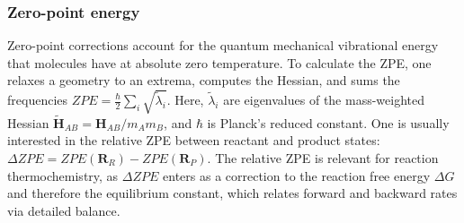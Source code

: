 \documentclass[pdflatex,sn-mathphys-num]{sn-jnl}%
\theoremstyle{thmstyleone}%
\theoremstyle{thmstyletwo}%
\theoremstyle{thmstylethree}%
\begin{document}
\begin{appendices}
\subsubsection{Zero-point energy}
Zero-point corrections account for the quantum mechanical vibrational energy that molecules have at absolute zero temperature. To calculate the ZPE, one relaxes a geometry to an extrema, computes the Hessian, and sums the frequencies
$ZPE = \frac{\hbar}{2} \sum_i \sqrt{\tilde{\lambda}_i}$.
Here, $\tilde{\lambda}_i$ are eigenvalues of the mass-weighted Hessian $\mathbf{\tilde{H}}_{AB} = \mathbf{H}_{AB}/m_Am_B$, and $\hbar$ is Planck's reduced constant.
One is usually interested in the relative ZPE between reactant and product states: $\Delta ZPE = ZPE(\mathbf{R}_R) - ZPE(\mathbf{R}_P)$. The relative ZPE is relevant for reaction thermochemistry, as $\Delta ZPE$ enters as a correction to the reaction free energy $\Delta G$ and therefore the equilibrium constant, which relates forward and backward rates via detailed balance.


\end{appendices}
\end{document}
